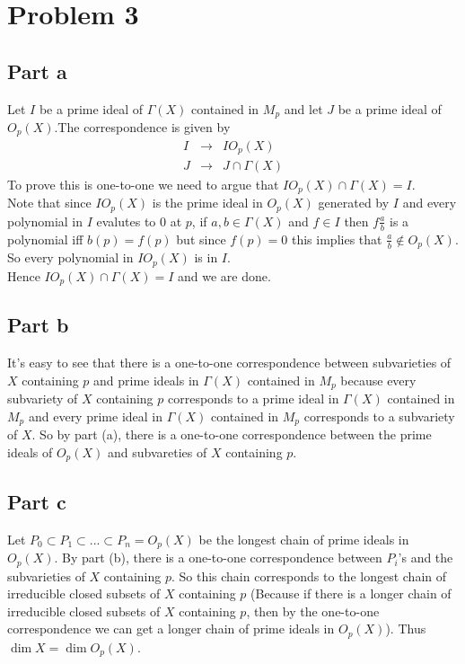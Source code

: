 \documentclass[12pt]{article}
\begin{document}
\clearpage
\section*{Problem 3}
\subsection*{Part a}
Let $I$ be a prime ideal of $\Gamma(X)$ contained in $M_p$ and let $J$ be a prime ideal of $O_p(X)$.The correspondence is given by
\begin{eqnarray*}
I &\rightarrow & IO_p(X) \\
J &\rightarrow & J \cap \Gamma(X)
\end{eqnarray*}
To prove this is one-to-one we need to argue that $IO_p(X) \cap \Gamma(X)=I$. \\
Note that since $IO_p(X)$ is the prime ideal in $O_p(X)$ generated by $I$ and every polynomial in $I$ evalutes to $0$ at $p$, if $a,b \in \Gamma(X)$ and $f \in I$ then
$f\frac{a}{b}$ is a polynomial iff $b(p)=f(p)$ but since $f(p)=0$ this implies that
$\frac{a}{b} \not\in O_p(X)$. So every polynomial in $IO_p(X)$ is in $I$. \\
Hence $IO_p(X) \cap \Gamma(X)=I$ and we are done.
\subsection*{Part b}
It's easy to see that there is a one-to-one correspondence between subvarieties of $X$ containing $p$ and prime ideals in $\Gamma(X)$ contained in $M_p$ because every subvariety of $X$ containing $p$ corresponds to a prime ideal in $\Gamma(X)$ contained in $M_p$ and every prime ideal in $\Gamma(X)$ contained in $M_p$ corresponds to a subvariety of $X$. So by part (a), there is a one-to-one correspondence between the prime ideals of $O_p(X)$ and subvareties of $X$ containing $p$.
\subsection*{Part c}
Let $P_0 \subset P_1 \subset ... \subset P_n=O_p(X)$ be the longest chain of prime ideals in $O_p(X)$. By part (b), there is a one-to-one correspondence between $P_i$'s and the subvarieties of $X$ containing $p$. So this chain corresponds to the longest chain of irreducible closed subsets of $X$ containing $p$ (Because if there is a longer chain of irreducible closed subsets of $X$ containing $p$, then by the one-to-one correspondence we can get a longer  chain of prime ideals in $O_p(X)$). Thus $\dim X=\dim O_p(X)$. \\
\end{document}
